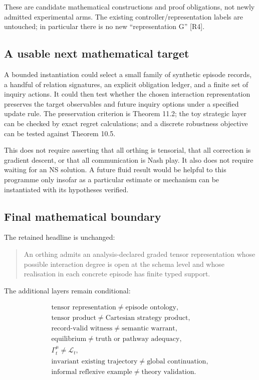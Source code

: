 \documentclass[11pt,a4paper]{article}
\begin{document}
These are candidate mathematical constructions and proof obligations,
not newly admitted experimental arms. The existing
controller/representation labels are untouched; in particular there is
no new ``representation G'' {[}R4{]}.

\subsection{A usable next mathematical
target}\label{a-usable-next-mathematical-target}

A bounded instantiation could select a small family of synthetic episode
records, a handful of relation signatures, an explicit obligation
ledger, and a finite set of inquiry actions. It could then test whether
the chosen interaction representation preserves the target observables
and future inquiry options under a specified update rule. The
preservation criterion is Theorem 11.2; the toy strategic layer can be
checked by exact regret calculations; and a discrete robustness
objective can be tested against Theorem 10.5.

This does not require asserting that all orthing is tensorial, that all
correction is gradient descent, or that all communication is Nash play.
It also does not require waiting for an NS solution. A future fluid
result would be helpful to this programme only insofar as a particular
estimate or mechanism can be instantiated with its hypotheses verified.

\subsection{Final mathematical
boundary}\label{final-mathematical-boundary}

The retained headline is unchanged:

\begin{quote}
An orthing admits an analysis-declared graded tensor representation
whose possible interaction degree is open at the schema level and whose
realisation in each concrete episode has finite typed support.
\end{quote}

The additional layers remain conditional:

\nopagebreak[4]

\[
\begin{gathered}
\text{tensor representation}\neq\text{episode ontology},\\
\text{tensor product}\neq\text{Cartesian strategy product},\\
\text{record-valid witness}\neq\text{semantic warrant},\\
\text{equilibrium}\neq\text{truth or pathway adequacy},\\
\Gamma_t^\mu\neq\mathcal L_t,\\
\text{invariant existing trajectory}\neq\text{global continuation},\\
\text{informal reflexive example}\neq\text{theory validation}.
\end{gathered}
\]
\end{document}
